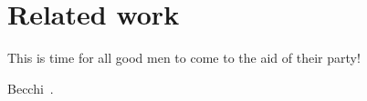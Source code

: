 \section{Related work}\label{related}
This is time for all good men to come to the aid of their party!

Becchi~\cite{Becchi:2007:IAA:1323548.1323573}.
